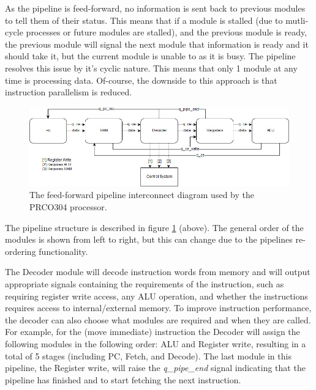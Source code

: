 \documentclass[11pt,a4paper]{report}
\newcommand{\scname}{PRCO304}
\begin{document}
As the pipeline is feed-forward, no information is sent back to previous modules to tell them of their status. This means that if a module is stalled (due to mutli-cycle processes or future modules are stalled), and the previous module is ready, the previous module will signal the next module that information is ready and it should take it, but the current module is unable to as it is busy. The pipeline resolves this issue by it's cyclic nature. This means that only 1 module at any time is processing data. Of-course, the downside to this approach is that instruction parallelism is reduced.

\begin{figure}[ht]
\centering
     \includegraphics[width=1.0\textwidth]{prco_forward_pipe}
      \caption{The feed-forward pipeline interconnect diagram used by the \scname{} processor.}
       \label{fig:prco_forward_pipe}
\end{figure}

The pipeline structure is described in figure \ref{fig:prco_forward_pipe} (above). The general order of the modules is shown from left to right, but this can change due to the pipelines re-ordering functionality.

The Decoder module will decode instruction words from memory and will output appropriate signals containing the requirements of the instruction, such as requiring register write access, any ALU operation, and whether the instructions requires access to internal/external memory.
\newline\newline
To improve instruction performance, the decoder can also choose what modules are required and when they are called. For example, for the {} (move immediate) instruction the Decoder will assign the following modules in the following order: ALU and Register write, resulting in a total of 5 stages (including PC, Fetch, and Decode). The last module in this pipeline, the Register write, will raise the \textit{q\_pipe\_end} signal indicating that the pipeline has finished and to start fetching the next instruction.
\end{document}
